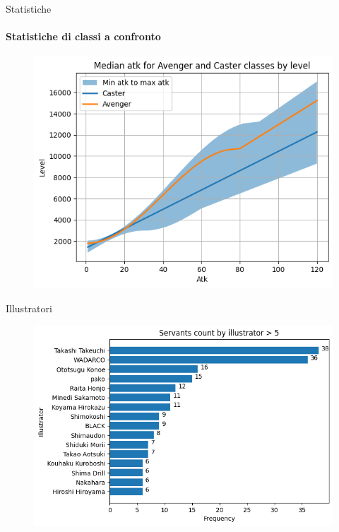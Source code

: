 \documentclass{beamer}
\begin{document}
\begin{darkframes}
  \begin{frame}{Statistiche}
    \framesubtitle{Statistiche di classi a confronto}
    \begin{figure}
      \centering
      \includegraphics[scale=0.6]{./images/caster_vs_avenger.png}
    \end{figure}
  \end{frame}

  \begin{frame}{Illustratori}
    \begin{figure}
      \centering
      \includegraphics[scale=0.55]{./images/illustrators.png}
    \end{figure}
  \end{frame}


\end{darkframes}
\end{document}
